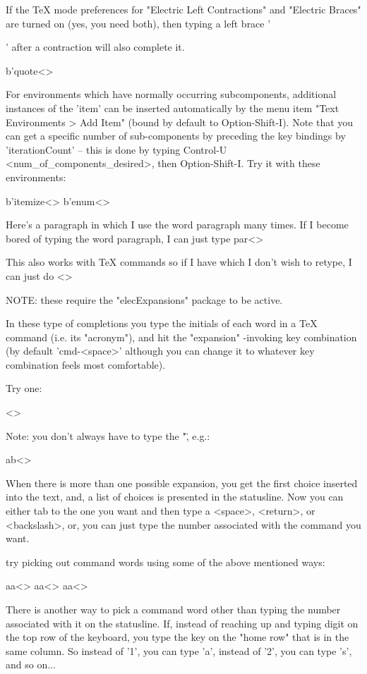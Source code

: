 If the TeX mode preferences for "Electric Left Contractions" and
"Electric Braces" are turned on (yes, you need both), then typing a
left brace '{' after a contraction will also complete it.

	b'quote<>

For environments which have normally occurring subcomponents,
additional instances of the 'item' can be inserted automatically by
the menu item "Text Environments > Add Item" (bound by default to
Option-Shift-I).  Note that you can get a specific number of
sub-components by preceding the key bindings by 'iterationCount' --
this is done by typing Control-U <num_of_components_desired>, then
Option-Shift-I.  Try it with these environments:

	b'itemize<>
	b'enum<>



Here's a paragraph in which I use the word paragraph many times.  If I 
become bored of typing the word paragraph, I can just type par<>

This also works with TeX commands so if I have \biglongcommand which I
don't wish to retype, I can just do \bigl<>



NOTE: these require the "elecExpansions" package to be active.

In these type of completions you type the initials of each word in a TeX
command (i.e. its "acronym"), and hit the "expansion" -invoking key
combination (by default 'cmd-<space>' although you can change it to
whatever key combination feels most comfortable).
 
Try one:

	\ab<>
	
Note: you don't always have to type the "\", e.g.:

	ab<>
	
When there is more than one possible expansion, you get the first choice 
inserted into the text, and, a list of choices is presented in the 
statusline.  Now you can either tab to the one you want and then type a 
<space>, <return>, or <backslash>, or, you can just type the number 
associated with the command you want.

try picking out command words using some of the above mentioned ways:

	aa<>
	aa<>
	aa<>

There is another way to pick a command word other than typing the number 
associated with it on the statusline.  If, instead of reaching up and typing 
digit on the top row of the keyboard, you type the key on the "home row" 
that is in the same column.  So instead of '1', you can type 'a', instead 
of '2', you can type 's', and so on...

}
